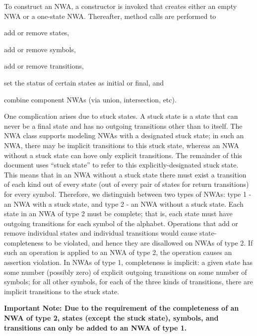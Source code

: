 \documentclass{llncs}
\begin{document}
To construct an NWA, a constructor is invoked that creates either an empty
NWA or a one-state NWA.  Thereafter, method calls are performed
to \begin{inparaenum} \item add or remove states, \item add or remove
  symbols, \item add or remove transitions, \item set the status of certain
  states as initial or final, and \item combine component NWAs (via union,
  intersection, etc). \end{inparaenum}


One complication arises due to stuck states.  A stuck state is a state that
can never be a final state and has no outgoing transitions other than to
itself.  The NWA class supports modeling NWAs with a designated stuck state;
in such an NWA, there may be implicit transitions to this stuck state,
whereas an NWA without a stuck state can hove only explicit transitions.  The
remainder of this document uses ``stuck state'' to refer to this
explicitly-designated stuck state.  This means that in an NWA without a stuck
state there must exist a transition of each kind out of every state (out of
every pair of states for return transitions) for every symbol.  Therefore, we
distinguish between two types of NWAs: type 1 - an NWA with a stuck state,
and type 2 - an NWA without a stuck state.  Each state in an NWA of type 2
must be complete; that is, each state must have outgoing transitions for each
symbol of the alphabet.  Operations that add or remove individual states and
individual transitions would cause state-completeness to be violated, and
hence they are disallowed on NWAs of type 2.  If such an operation is applied
to an NWA of type 2, the operation causes an assertion violation.  In NWAs of
type 1, completeness is implicit: a given state has some number (possibly
zero) of explicit outgoing transitions on some number of symbols; for all
other symbols, for each of the three kinds of transitions, there are implicit
transitions to the stuck state.

\textbf{Important Note: Due to the requirement of the completeness of an NWA
  of type 2, states (except the stuck state), symbols, and transitions can
  only be added to an NWA of type 1.}
\end{document}

